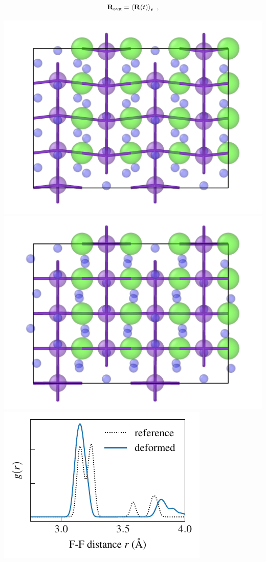 \begin{align}
	{\bf R}_{\rm avg} = \braket{{\bf R} (t)}_t~,	
	\label{eq:R(t).avg}
\end{align}
%
\begin{marginfigure}[-3cm]
	\includegraphics[width=\textwidth]{./data/plots/defects/062.05.KCaF3/plots/ref_left.png}
	\includegraphics[width=\textwidth]{./data/plots/defects/062.05.KCaF3/plots/2_left.png}
	\includegraphics[width=\textwidth]{./data/plots/defects/062.05.KCaF3/rdf/geometry_in_def_2.pdf}

\end{marginfigure}
